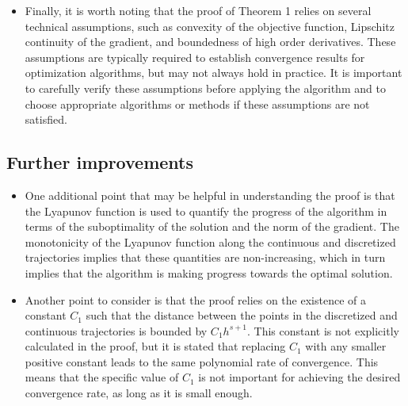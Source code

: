 \begin{itemize}
    \item Finally, it is worth noting that the proof of Theorem 1 relies on several technical assumptions, such as convexity of the objective function, Lipschitz continuity of the gradient, and boundedness of high order derivatives. These assumptions are typically required to establish convergence results for optimization algorithms, but may not always hold in practice. It is important to carefully verify these assumptions before applying the algorithm and to choose appropriate algorithms or methods if these assumptions are not satisfied.

\end{itemize}
\subsection{Further improvements}
\begin{itemize}
    \item One additional point that may be helpful in understanding the proof is that the Lyapunov function is used to quantify the progress of the algorithm in terms of the suboptimality of the solution and the norm of the gradient. The monotonicity of the Lyapunov function along the continuous and discretized trajectories implies that these quantities are non-increasing, which in turn implies that the algorithm is making progress towards the optimal solution.

    \item Another point to consider is that the proof relies on the existence of a constant $C_1$ such that the distance between the points in the discretized and continuous trajectories is bounded by $C_1 h^{s+1}$. This constant is not explicitly calculated in the proof, but it is stated that replacing $C_1$ with any smaller positive constant leads to the same polynomial rate of convergence. This means that the specific value of $C_1$ is not important for achieving the desired convergence rate, as long as it is small enough.
\end{itemize}
